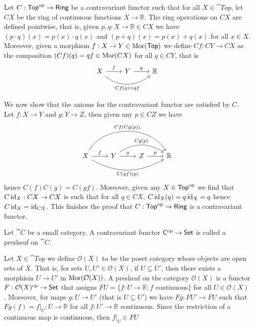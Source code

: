 \begin{example}
  Let \(C: \mathsf{Top}^{\mathrm{op}} \to \mathsf{Ring}\) be a contravariant functor such that
  for all \(X \in \cat{Top}\), let \(C X\) be the ring of continuous functions
  \(X \to \mathbb{R}\). The ring operations on \(C X\) are defined pointwise,
  that is, given \(p, q: X \to \mathbb{R} \in C X\) we have \((p \cdot q) (x) =
  p(x) \cdot q(x)\) and \((p + q)(x) = p(x) + q(x)\) for all \(x \in X\).
  Moreover, given a morphism \(f: X \to Y \in \operatorname{Mor}(\mathsf{Top})\) we define \(C f:
  C Y \to C X\) as the composition \((C f)(q) = q f \in \operatorname{Mor}(C X)\) for all \(q
  \in C Y\), that is
  \[
    \begin{tikzcd}
      X \ar[r, "f"] \ar[rr, bend right = 40, swap, "C f(q) = q f"]
      & Y \ar[r, "q"] & \mathbb{R}
    \end{tikzcd}
  \]

  We now show that the axioms for the contravariant functor are satisfied by
  \(C\). Let \(f: X \to Y\) and \(g: Y \to Z\), then given any \(p \in C Z\) we
  have
  \[
    \begin{tikzcd}
      X \ar[r, "f"]
      \ar[rrr, bend left = 60, "C f(C g (p))"]
      \ar[rrr, bend right, swap, "C (g f)(p)"]
      & Y \ar[r, "g"]
      \ar[rr, bend left = 35, "C g(p)"]
      & Z \ar[r, "p"] & \mathbb{R}
    \end{tikzcd}
  \]
  hence \(C (f) C (g) = C (g f)\). Moreover, given any \(X \in \mathsf{Top}^{\mathrm{op}}\)
  we find that \(C \operatorname{id}_X: C X \to C X\) is such that for all \(q \in C X\), \(C
  \operatorname{id}_X (q) = q \operatorname{id}_X = q\) hence \(C \operatorname{id}_X = \operatorname{id}_{C X}\). This finishes the
  proof that \(C: \mathsf{Top}^{\mathrm{op}} \to \mathsf{Ring}\) is a contravariant functor.
\end{example}

\begin{definition}[Presheaf]\label{def: presheaf}
  Let \(\cat C\) be a small category. A contravariant functor \(\mathsf C^{\mathrm{op}} \to
  \mathsf{Set}\) is called a presheaf on \(\cat C\).
\end{definition}

\begin{example}
  Let \(X \in \cat{Top}\) we define \(\mathcal O(X)\) to be the poset category
  whose objects are open sets of \(X\). That is, for sets \(U, U' \in \mathcal
  O(X)\), if \(U \subseteq U'\), then there exists a morphism \(U \to U'\) in
  \(\operatorname{Mor}(\mathcal O(X))\). A presheaf on the category \(\mathcal O(X)\) is a
  functor \(F: \mathcal O(X)^{\mathrm{op}} \to \mathsf{Set}\) that assigns \(F U = \{f: U \to
  \mathbb{R}: f \text{ continuous}\}\) for all \(U \in \mathcal O(X)\).
  Moreover, for maps \(g: U \to U'\) (that is \(U \subseteq U'\)) we have \(F g:
  F U' \to F U\) such that \(F g(f) = f|_U: U \to \mathbb{R}\) for all \(f: U'
  \to \mathbb{R}\) continuous. Since the restriction of a continuous map is
  continuous, then \(f|_U \in F U\)
\end{example}

